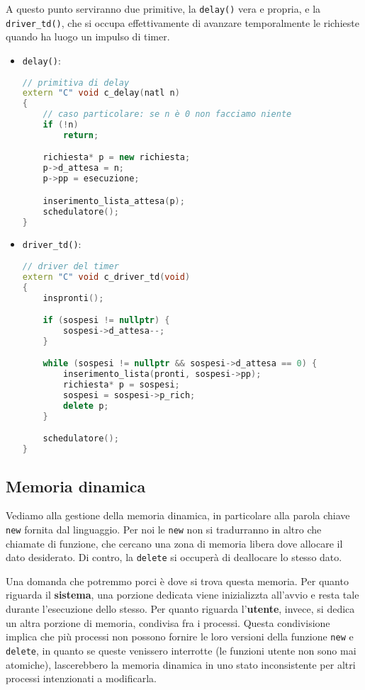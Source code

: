 \documentclass[a4paper,11pt]{article}
\begin{document}
A questo punto serviranno due primitive, la \lstinline|delay()| vera e propria, e la \lstinline|driver_td()|, che si occupa effettivamente di avanzare temporalmente le richieste quando ha luogo un impulso di timer.
\begin{itemize}
	\item \lstinline|delay()|:
\begin{lstlisting}[language=C++, style=codestyle]	
// primitiva di delay
extern "C" void c_delay(natl n)
{
	// caso particolare: se n è 0 non facciamo niente
	if (!n)
		return;

	richiesta* p = new richiesta;
	p->d_attesa = n;
	p->pp = esecuzione;

	inserimento_lista_attesa(p);
	schedulatore();
}
\end{lstlisting}
	\item \lstinline|driver_td()|:
\begin{lstlisting}[language=C++, style=codestyle]	
// driver del timer
extern "C" void c_driver_td(void)
{
	inspronti();

	if (sospesi != nullptr) {
		sospesi->d_attesa--;
	}

	while (sospesi != nullptr && sospesi->d_attesa == 0) {
		inserimento_lista(pronti, sospesi->pp);
		richiesta* p = sospesi;
		sospesi = sospesi->p_rich;
		delete p;
	}

	schedulatore();
}
\end{lstlisting}
\end{itemize}

\subsection{Memoria dinamica}
\lstset{language=C++}
Vediamo alla gestione della memoria dinamica, in particolare alla parola chiave \lstinline|new| fornita dal linguaggio.
Per noi le \lstinline|new| non si tradurranno in altro che chiamate di funzione, che cercano una zona di memoria libera dove allocare il dato desiderato.
Di contro, la \lstinline|delete| si occuperà di deallocare lo stesso dato.

Una domanda che potremmo porci è dove si trova questa memoria.
Per quanto riguarda il \textbf{sistema}, una porzione dedicata viene inizializzta all'avvio e resta tale durante l'esecuzione dello stesso.
Per quanto riguarda l'\textbf{utente}, invece, si dedica un altra porzione di memoria, condivisa fra i processi.
Questa condivisione implica che più processi non possono fornire le loro versioni della funzione \lstinline|new| e \lstinline|delete|, in quanto se queste venissero interrotte (le funzioni utente non sono mai atomiche), lascerebbero la memoria dinamica in uno stato inconsistente per altri processi intenzionati a modificarla.
\end{document}
